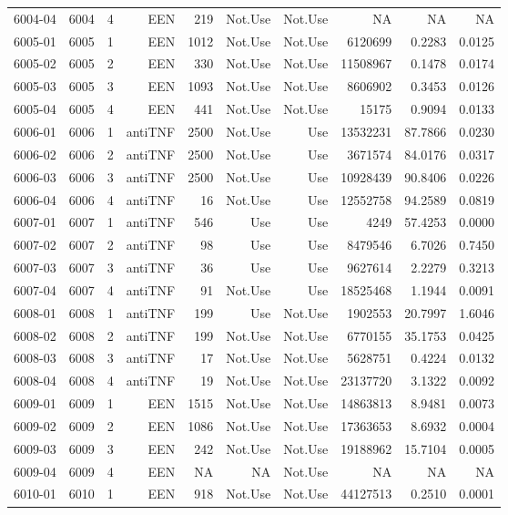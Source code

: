 {\begin{longtable}{ | r | r | r | r | r | r | r | r | r | r | }
6004-04 & 6004 & 4 & EEN & 219 & Not.Use & Not.Use & NA & NA & NA\\ 
6005-01 & 6005 & 1 & EEN & 1012 & Not.Use & Not.Use & 6120699 & 0.2283 & 0.0125\\ 
6005-02 & 6005 & 2 & EEN & 330 & Not.Use & Not.Use & 11508967 & 0.1478 & 0.0174\\ 
6005-03 & 6005 & 3 & EEN & 1093 & Not.Use & Not.Use & 8606902 & 0.3453 & 0.0126\\ 
6005-04 & 6005 & 4 & EEN & 441 & Not.Use & Not.Use & 15175 & 0.9094 & 0.0133\\ 
6006-01 & 6006 & 1 & antiTNF & 2500 & Not.Use & Use & 13532231 & 87.7866 & 0.0230\\ 
6006-02 & 6006 & 2 & antiTNF & 2500 & Not.Use & Use & 3671574 & 84.0176 & 0.0317\\ 
6006-03 & 6006 & 3 & antiTNF & 2500 & Not.Use & Use & 10928439 & 90.8406 & 0.0226\\ 
6006-04 & 6006 & 4 & antiTNF & 16 & Not.Use & Use & 12552758 & 94.2589 & 0.0819\\ 
6007-01 & 6007 & 1 & antiTNF & 546 & Use & Use & 4249 & 57.4253 & 0.0000\\ 
6007-02 & 6007 & 2 & antiTNF & 98 & Use & Use & 8479546 & 6.7026 & 0.7450\\ 
6007-03 & 6007 & 3 & antiTNF & 36 & Use & Use & 9627614 & 2.2279 & 0.3213\\ 
6007-04 & 6007 & 4 & antiTNF & 91 & Not.Use & Use & 18525468 & 1.1944 & 0.0091\\ 
6008-01 & 6008 & 1 & antiTNF & 199 & Use & Not.Use & 1902553 & 20.7997 & 1.6046\\ 
6008-02 & 6008 & 2 & antiTNF & 199 & Not.Use & Not.Use & 6770155 & 35.1753 & 0.0425\\ 
6008-03 & 6008 & 3 & antiTNF & 17 & Not.Use & Not.Use & 5628751 & 0.4224 & 0.0132\\ 
6008-04 & 6008 & 4 & antiTNF & 19 & Not.Use & Not.Use & 23137720 & 3.1322 & 0.0092\\ 
6009-01 & 6009 & 1 & EEN & 1515 & Not.Use & Not.Use & 14863813 & 8.9481 & 0.0073\\ 
6009-02 & 6009 & 2 & EEN & 1086 & Not.Use & Not.Use & 17363653 & 8.6932 & 0.0004\\ 
6009-03 & 6009 & 3 & EEN & 242 & Not.Use & Not.Use & 19188962 & 15.7104 & 0.0005\\ 
6009-04 & 6009 & 4 & EEN & NA & NA & Not.Use & NA & NA & NA\\ 
6010-01 & 6010 & 1 & EEN & 918 & Not.Use & Not.Use & 44127513 & 0.2510 & 0.0001\\ 

\end{longtable}}
